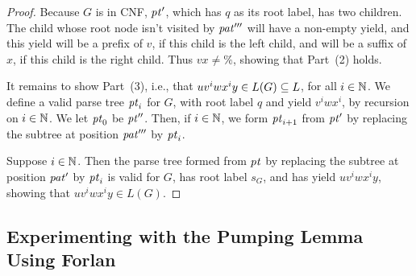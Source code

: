 \begin{proof}
Because $G$ is in CNF, ${\it pt}'$, which has $q$ as its root label, has
two children.  The child whose root node isn't visited by ${\it pat}'''$
will have a non-empty yield, and this yield will be a prefix of $v$,
if this child is the left child, and will be a suffix of $x$, if this
child is the right child.  Thus $vx\neq\%$, showing that Part~(2)
holds.

It remains to show Part~(3), i.e., that $uv^iwx^iy\in L(G)\subseteq L$, for
all $i\in\mathbb{N}$.  We define a valid parse tree ${\it pt}_i$ for $G$, with root
label $q$ and yield $v^iwx^i$, by recursion on $i\in\mathbb{N}$.  We let ${\it pt}_0$ be
${\it pt}''$.  Then, if $i\in\mathbb{N}$, we form ${\it pt}_{i+1}$ from ${\it pt}'$ by
replacing the subtree at position ${\it pat}'''$ by ${\it pt}_i$.

Suppose $i\in\mathbb{N}$.  Then the parse tree formed from ${\it pt}$ by
replacing the subtree at position ${\it pat}'$ by ${\it pt}_i$ is valid for $G$,
has root label $s_G$, and has yield $uv^iwx^iy$, showing that
$uv^iwx^iy\in L(G)$.
\end{proof}

\subsection{Experimenting with the Pumping Lemma Using Forlan}

